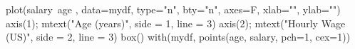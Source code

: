 \begin{Schunk}
\begin{Sinput}
 plot(salary~age , data=mydf, type="n", bty="n", axes=F, xlab="", ylab="")
 axis(1); mtext("Age (years)", side = 1, line = 3)
 axis(2); mtext("Hourly Wage (US)", side = 2, line = 3)
 box()
 with(mydf, points(age, salary, pch=1, cex=1))
\end{Sinput}
\end{Schunk}
